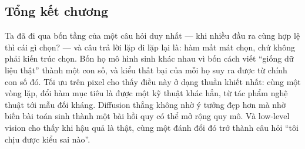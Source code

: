 \documentclass[../../deep_learning.tex]{subfiles}
\begin{document}
\subsection*{Tổng kết chương}
Ta đã đi qua bốn tầng của một câu hỏi duy nhất --- khi nhiều đầu ra cùng hợp lệ thì cái gì chọn? --- và câu trả lời lặp đi lặp lại là: hàm mất mát chọn, chứ không phải kiến trúc chọn. Bốn họ mô hình sinh khác nhau vì bốn cách viết ``giống dữ liệu thật'' thành một con số, và kiểu thất bại của mỗi họ suy ra được từ chính con số đó. Tối ưu trên pixel cho thấy điều này ở dạng thuần khiết nhất: cùng một vòng lặp, đổi hàm mục tiêu là được một kỹ thuật khác hẳn, từ tác phẩm nghệ thuật tới mẫu đối kháng. Diffusion thắng không nhờ ý tưởng đẹp hơn mà nhờ biến bài toán sinh thành một bài hồi quy có thể mở rộng quy mô. Và low-level vision cho thấy khi hậu quả là thật, cùng một đánh đổi đó trở thành câu hỏi ``tôi chịu được kiểu sai nào''.
\end{document}
